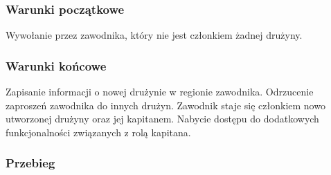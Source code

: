 \subsubsection{Warunki początkowe}
Wywołanie przez zawodnika, który nie jest członkiem żadnej drużyny.

\subsubsection{Warunki końcowe}
Zapisanie informacji o nowej drużynie w regionie zawodnika. Odrzucenie zaproszeń zawodnika do innych drużyn. Zawodnik staje się członkiem nowo utworzonej drużyny oraz jej kapitanem. Nabycie dostępu do dodatkowych funkcjonalności związanych z rolą kapitana.

\subsubsection{Przebieg}
